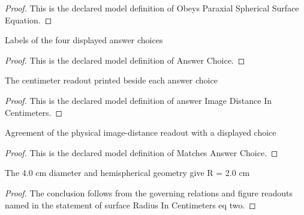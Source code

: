 \begin{proof}
  This is the declared model definition of Obeys Paraxial Spherical Surface Equation.
\end{proof}
\begin{definition}
  \label{def:physics:phyx-mini-0054:phyxminiproblems-problemphyxmini0054-answerchoice}
  Labels of the four displayed answer choices
\end{definition}
\begin{proof}
  This is the declared model definition of Answer Choice.
\end{proof}
\begin{definition}
  \label{def:physics:phyx-mini-0054:phyxminiproblems-problemphyxmini0054-answerimagedistanceincentimeters}
  The centimeter readout printed beside each answer choice
\end{definition}
\begin{proof}
  This is the declared model definition of answer Image Distance In Centimeters.
\end{proof}
\begin{definition}
  \label{def:physics:phyx-mini-0054:phyxminiproblems-problemphyxmini0054-matchesanswerchoice}
  Agreement of the physical image-distance readout with a displayed choice
\end{definition}
\begin{proof}
  This is the declared model definition of Matches Answer Choice.
\end{proof}
\begin{lemma}
  \label{lem:physics:phyx-mini-0054:phyxminiproblems-problemphyxmini0054-surfaceradiusincentimeters-eq-two}
  The 4.0 cm diameter and hemispherical geometry give R = 2.0 cm
\end{lemma}
\begin{proof}
  The conclusion follows from the governing relations and figure readouts named in the statement of surface Radius In Centimeters eq two.
\end{proof}
